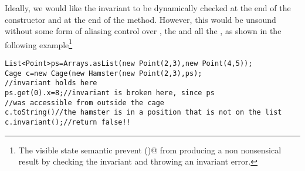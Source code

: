 \begin{comment}

\newpage
\begin{lstlisting}
class SafeMovable implements Widget{
  @Override read method Widgets children(){return this.box.cs;}
  @Override read method Int left(){return this.box.l;}
  @Override read method Int top(){return this.box.t;}
  @Override read method Int width(){return this.w;}
  @Override read method Int height(){return this.h;}
  capsule Box box;
  Int w; Int h;
  read method Bool invariant(){//iterate on box.cs, check:
    //not overlap with each other, are inside the widget bounds
  }
  SafeMovable(Int w,Int h,capsule List<Widget> cs) {
    this.w=w; this.h=h; this.box=boxWithButton(cs);}
  static method capsule Box boxWithButton(capsule Widgets cs){
    mut Box b=new Box(5,5,cs);
    b.cs.add(new Button(0,0,10,10,new MoveAction(b));
    return b;//b is declare mut, but it is soundly returned capsule
  }}
\end{lstlisting}

\begin{lstlisting}
class Box{
  Int l; Int t; mut List<Widget> cs;
  Box(Int l, Int t, mut List<Widget> cs){...} }

class MoveAction implements Action{
  mut Box outer; MoveAction(mut Box outer){this.outer=outer;}
  mut method Void process(Event event) {this.outer.l+=1;} }
\end{lstlisting}

\begin{lstlisting}
class Point {int x; int y;
  /*... constructor, equals and other obvious utility methods*/}
class Hamster { Point pos; Hamster(Point pos){this.pos=pos;} }
class Cage {
  Hamster h;  List<Point> path;
  Cage(Hamster h, List<Point> path){ this.h=h; this.path=path; }
  bool invariant(){
    return this.path.contains(this.h.pos);
  }
  void move() {
    int index=1+this.path.indexOf(this.h.pos);
    if (index>=this.path.size()) {index=0;}
    this.h.pos=this.path.get(index);
  }
  String toString(){return "hPos:"+this.h.pos+", path:"+this.path;}
}
\end{lstlisting}
\end{comment}
Ideally, we would like the invariant to be dynamically checked 
at the end of the constructor and at the end of the \Q@move@ method.
However, this would be unsound without some form of aliasing control over \Q@Hamster@,
the \Q@List@ and all the \Q@Point@s, as shown in the following example\footnote{
The visible state semantic prevent \Q@toString()@ from producing a non nonsensical result
by checking the invariant and throwing an invariant error.
}
\begin{lstlisting}
List<Point>ps=Arrays.asList(new Point(2,3),new Point(4,5));
Cage c=new Cage(new Hamster(new Point(2,3),ps);
//invariant holds here
ps.get(0).x=8;//invariant is broken here, since ps
//was accessible from outside the cage
c.toString()//the hamster is in a position that is not on the list
c.invariant();//return false!!
\end{lstlisting}

